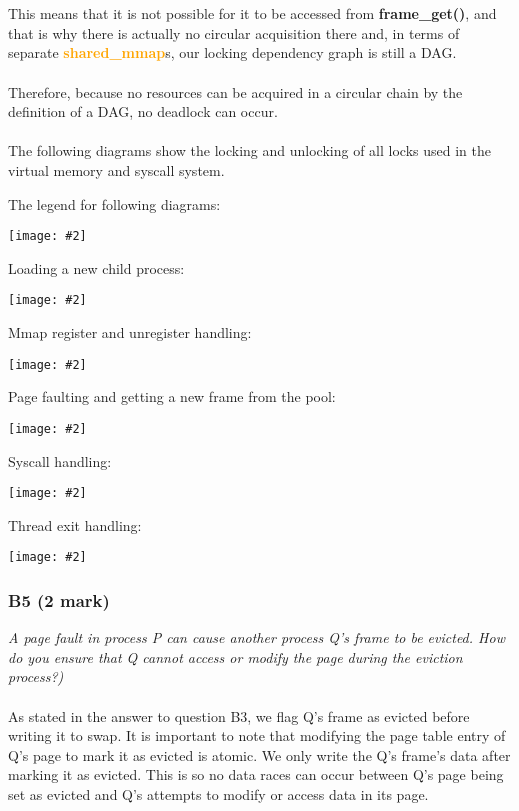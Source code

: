 \documentclass{report}
\newcommand{\question}[1]{\textit{#1} \ }
\newcommand{\fun}[1]{\textcolor{Emerald}{\textbf{#1}}}
\newcommand{\struct}[1]{\textcolor{orange}{\textbf{#1}}}
\newcommand{\centerimage}[2]{\begin{center}
	\texttt{[image: \#2]}
\end{center}}
\begin{document}
				\\
				\\This means that it is not possible for it to be accessed from \fun{frame\_get()}, and that is why there is actually
				no circular acquisition there and, in terms of separate \struct{shared\_mmap}s, our locking dependency graph is still a DAG.
				\\
				\\ Therefore, because no resources can be acquired in a circular
				chain by the definition of a DAG, no deadlock can occur.
				\\
				\\The following diagrams show the locking and unlocking of all locks used in the virtual memory and syscall system.
				\\
				\begin{minipage}{\textwidth}
					The legend for following diagrams:
					\centerimage{width=\textwidth}{synch legend.png}
				\end{minipage}
				\begin{minipage}{\textwidth}
					Loading a new child process:
					\centerimage{width=\textwidth}{synch load.png}
				\end{minipage}
				\begin{minipage}{\textwidth}
					Mmap register and unregister handling:
					\centerimage{width=\textwidth}{synch mmap.png}
				\end{minipage}
				\begin{minipage}{\textwidth}
					Page faulting and getting a new frame from the pool:
					\centerimage{width=\textwidth}{synch page fault.png}
				\end{minipage}

				\begin{minipage}{\textwidth}
					Syscall handling:
					\centerimage{width=\textwidth}{synch syscall.png}
				\end{minipage}

				\begin{minipage}{\textwidth}
					Thread exit handling:
					\centerimage{width=\textwidth}{synch thread exit.png}
				\end{minipage}
				
			\subsubsection*{B5 (2 mark)}
				\question{A page fault in process P can cause another process Q's frame to
				be evicted. How do you ensure that Q cannot access or modify the page 
				during the eviction process?)}
				\\
				\\As stated in the answer to question B3, we flag Q's frame as evicted 
				before writing it to swap. It is important to note that modifying the 
				page table entry of Q's page to mark it as evicted is atomic. We
				only write the Q's frame's data after marking it as evicted. This is 
				so no data races can occur between Q's page being set as evicted and Q's 
				attempts to modify or access data in its page.
				
\end{document}
